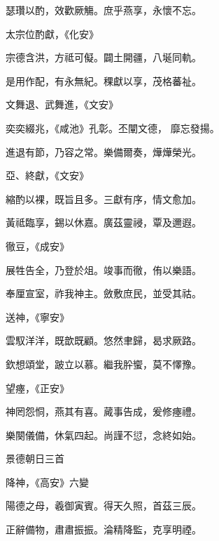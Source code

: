 \begin{pinyinscope}
 瑟瓚以酌，效歡厥觴。庶乎燕享，永懷不忘。



 太宗位酌獻，《化安》



 宗德含洪，方祗可儗。闢土開疆，八埏同軌。



 是用作配，有永無紀。稞獻以享，茂格蕃祉。



 文舞退、武舞進，《文安》



 奕奕綴兆，《咸池》孔彰。丕闡文德，
 靡忘發揚。



 進退有節，乃容之常。樂備爾奏，燁燁榮光。



 亞、終獻，《文安》



 縮酌以裸，既旨且多。三獻有序，情文愈加。



 黃祗臨享，錫以休嘉。廣茲靈祲，覃及邇遐。



 徹豆，《成安》



 展牲告全，乃登於俎。竣事而徹，侑以樂語。



 奉厘宣室，祚我神主。斂敷庶民，並受其祜。



 送神，《寧安》



 雲馭洋洋，既歆既顧。悠然聿歸，曷求厥路。



 欽想頌堂，跛立以慕。繼我肸蠁，莫不懌豫。



 望瘞，《正安》



 神罔怨恫，燕其有喜。蕆事告成，爰修瘞禮。



 樂闋儀備，休氣四起。尚謹不愆，念終如始。



 景德朝日三首



 降神，《高安》六變



 陽德之母，羲御寅賓。得天久照，首茲三辰。



 正辭備物，肅肅振振。淪精降監，克享明禋。




\end{pinyinscope}
